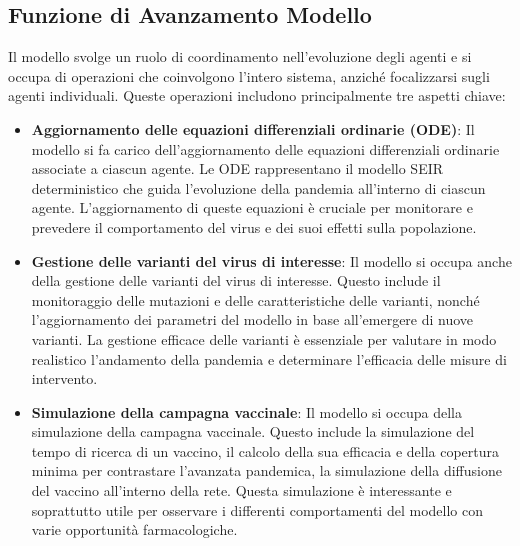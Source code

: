 \newpage

\subsection{Funzione di Avanzamento Modello}

Il modello svolge un ruolo di coordinamento nell'evoluzione degli agenti 
e si occupa di operazioni che coinvolgono l'intero sistema, 
anziché focalizzarsi sugli agenti individuali. 
Queste operazioni includono principalmente tre aspetti chiave:

\begin{itemize}
	\item \textbf{Aggiornamento delle equazioni differenziali 
	ordinarie (ODE)}: Il modello si fa carico dell'aggiornamento 
	delle equazioni differenziali ordinarie associate a ciascun agente. 
	Le ODE rappresentano il modello SEIR deterministico che guida 
	l'evoluzione della pandemia all'interno di ciascun agente. 
	L'aggiornamento di queste equazioni è cruciale per monitorare e 
	prevedere il comportamento del virus e dei suoi effetti sulla 
	popolazione.
	\item \textbf{Gestione delle varianti del virus di interesse}: Il 
	modello si occupa anche della gestione delle varianti del virus 
	di interesse. Questo include il monitoraggio delle mutazioni e 
	delle caratteristiche delle varianti, nonché l'aggiornamento dei 
	parametri del modello in base all'emergere di nuove varianti. 
	La gestione efficace delle varianti è essenziale per valutare in 
	modo realistico l'andamento della pandemia e determinare 
	l'efficacia delle misure di intervento.
     \item \textbf{Simulazione della campagna vaccinale}: Il 
	modello si occupa della simulazione della campagna vaccinale.
    Questo include la simulazione del tempo di ricerca di un vaccino,
    il calcolo della sua efficacia e della copertura minima per contrastare
    l'avanzata pandemica, la simulazione della diffusione del vaccino 
    all'interno della rete. Questa simulazione è interessante e 
    soprattutto utile per osservare i differenti comportamenti 
    del modello con varie opportunità farmacologiche.
\end{itemize}

